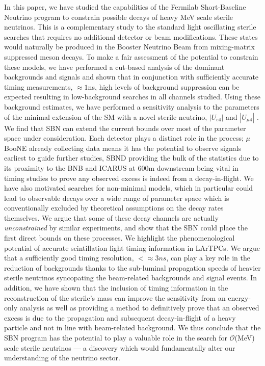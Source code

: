 \documentclass[11pt, a4paper]{article}
\begin{document}
In this paper, we have studied the capabilities of the Fermilab Short-Baseline
Neutrino program to constrain possible decays of heavy MeV scale sterile
neutrinos. This is a complementary study to the standard light oscillating
sterile searches that requires no additional detector or beam modifications.
These states would naturally be produced in the Booster Neutrino Beam from
mixing-matrix suppressed meson decays. To make a fair assessment of the
potential to constrain these models, we have performed a cut-based analysis of
the dominant backgrounds and signals and shown that in conjunction with
sufficiently accurate timing measurements, $\approx 1$ns, high levels of
background suppression can be expected resulting in low-background searches in
all channels studied. Using these background estimates, we have performed a
sensitivity analysis to the parameters of the minimal extension of the SM with
a novel sterile neutrino, $|U_{e4}|$ and $|U_{\mu4}|$ . 
%
We find that SBN can extend the current bounds over most of the parameter space
under consideration. Each detector plays a distinct role in the process; $\mu$BooNE already collecting data means it has the potential to observe signals earliest to guide further studies, SBND providing the bulk of the statistics due to its proximity to the BNB and ICARUS at 600m downstream being vital in timing studies to prove any observed excess is indeed from a decay-in-flight.
%
We have also motivated searches for non-minimal models, which in particular
could lead to observable decays over a wide range of parameter space which is
conventionally excluded by theoretical assumptions on the decay rates
themselves. We argue that some of these decay channels are actually
\emph{unconstrained} by similar experiments, and show that the SBN could place
the first direct bounds on these processes.
%
We highlight the phenomenological potential of accurate scintillation light timing information
in LArTPCs. We argue that a sufficiently good timing resolution, $< \approx 3ns$, can play a key role in the reduction of
backgrounds thanks to the sub-luminal propagation speeds of heavier sterile
neutrinos syncopating the beam-related backgrounds and signal events. In addition, we have shown that the inclusion of timing information in the
reconstruction of the sterile's mass can improve the sensitivity from an
energy-only analysis as well as providing a method to definitively prove that an observed excess is due to the propagation and subsequent decay-in-flight of a heavy particle and not in line with beam-related background.
%
We thus conclude that the SBN program has the potential to play a valuable role in the
search for $\mathcal{O}$(MeV) scale sterile neutrinos --- a discovery which would
fundamentally alter our understanding of the neutrino sector.
\end{document}
